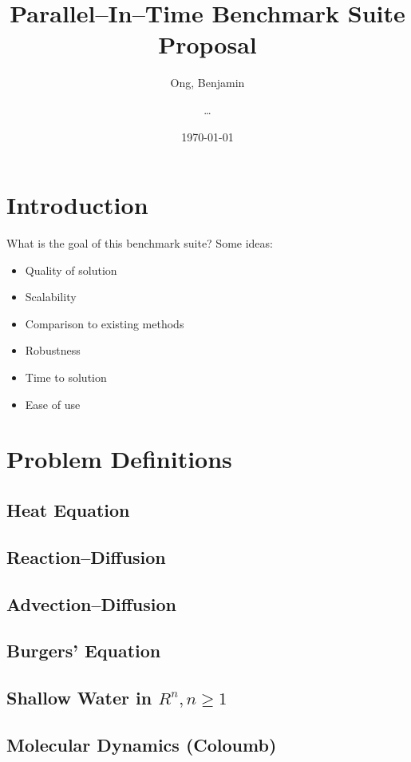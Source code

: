 \documentclass[12pt]{article}
\title{Parallel--In--Time Benchmark Suite Proposal}
\author{Ong, Benjamin \and \ldots}
\date{\today}
\begin{document}
\maketitle

\section{Introduction}
What is the goal of this benchmark suite?  Some ideas:
\begin{itemize}
\item Quality of solution
\item Scalability
\item Comparison to existing methods
\item Robustness
\item Time to solution
\item Ease of use
\end{itemize}

\section{Problem Definitions}

\subsection{Heat Equation}

\subsection{Reaction--Diffusion}


\subsection{Advection--Diffusion}


\subsection{Burgers' Equation}


\subsection{Shallow Water in $R^{n}, n \ge 1$ }


\subsection{Molecular Dynamics (Coloumb)}

\end{document}
